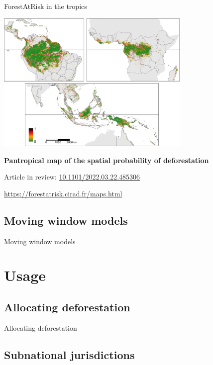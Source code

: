 \documentclass[10pt,table,dvipsnames,compress]{beamer}
\begin{document}
\begin{frame}[label={sec:org6d0c9bb}]{ForestAtRisk in the tropics}
\begin{center}
\includegraphics[width=0.7\textwidth]{figs/article/prob.png}
\end{center}

\textbf{Pantropical map of the spatial probability of deforestation}

Article in review: \href{https://doi.org/10.1101/2022.03.22.485306}{10.1101/2022.03.22.485306}

\url{https://forestatrisk.cirad.fr/maps.html}
\end{frame}

\subsection{Moving window models}
\label{sec:org49fd4f6}

\begin{frame}[label={sec:orge573e0a}]{Moving window models}
\end{frame}

\section{Usage}
\label{sec:org3ba92f7}

\subsection{Allocating deforestation}
\label{sec:org5e0ee9a}

\begin{frame}[label={sec:orged23e10}]{Allocating deforestation}
\end{frame}

\subsection{Subnational jurisdictions}
\label{sec:org5d6c8ab}
\end{document}
